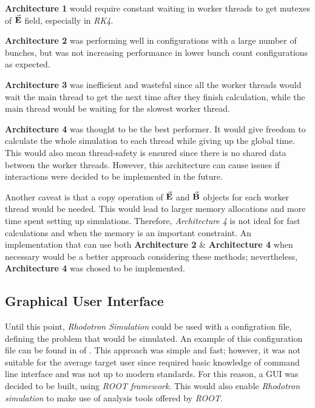 \documentclass[a4paper,oneside,12pt]{report}
\numberwithin{equation}{chapter}
\begin{document}
\textbf{Architecture 1} would require constant waiting in worker threads to get mutexes of $\vec{\textbf{E}}$ field, especially in \textit{RK4}.

\textbf{Architecture 2} was performing well in configurations with a large number of bunches, but was not increasing performance in lower bunch count configurations as expected.

\textbf{Architecture 3} was inefficient and wasteful since all the worker threads would wait the main thread to get the next time after they finish calculation, while the main thread would be waiting for the slowest worker thread.

\textbf{Architecture 4} was thought to be the best performer. It would give freedom to calculate the whole simulation to each thread while giving up the global time.
This would also mean thread-safety is ensured since there is no shared data between the worker threads. 
However, this architecture can cause issues if \ee interactions were decided to be implemented in the future.

Another caveat is that a copy operation of $\vec{\textbf{E}}$ and $\vec{\textbf{B}}$ objects for each worker thread would be needed.
This would lead to larger memory allocations and more time spent setting up simulations. 
Therefore, \textit{Architecture 4} is not ideal for fast calculations and when the memory is an important constraint.
An implementation that can use both \textbf{Architecture 2} \& \textbf{Architecture 4} when necessary would be a better approach considering these methods;
nevertheless, \textbf{Architecture 4} was chosed to be implemented.





\subsection{Graphical User Interface}
Until this point, \textit{Rhodotron Simulation} could be used with a configration file, defining the problem that would be simulated.
An example of this configuration file can be found in  of . 
This approach was simple and fast; however, it was not suitable for the average target user since required basic knowledge of command line interface and was not up to modern standards.
For this reason, a GUI was decided to be built, using \textit{ROOT framework}. 
This would also enable \textit{Rhodotron simulation} to make use of analysis tools offered by \textit{ROOT}.
\end{document}
